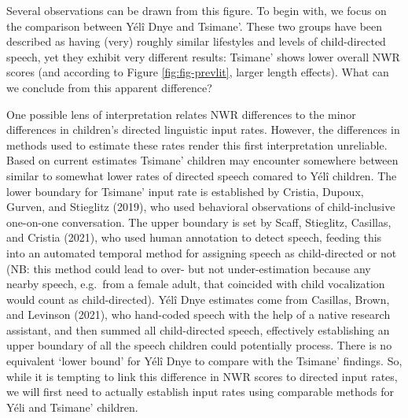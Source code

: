 \documentclass[
  american,
  ,doc,floatsintext]{apa6}
\begin{document}
Several observations can be drawn from this figure. To begin with, we focus on the comparison between Yélî Dnye and Tsimane'. These two groups have been described as having (very) roughly similar lifestyles and levels of child-directed speech, yet they exhibit very different results: Tsimane' shows lower overall NWR scores (and according to Figure \ref{fig:fig-prevlit}, larger length effects). What can we conclude from this apparent difference?

One possible lens of interpretation relates NWR differences to the minor differences in children's directed linguistic input rates. However, the differences in methods used to estimate these rates render this first interpretation unreliable. Based on current estimates Tsimane' children may encounter somewhere between similar to somewhat lower rates of directed speech comared to Yélî children. The lower boundary for Tsimane' input rate is established by Cristia, Dupoux, Gurven, and Stieglitz (2019), who used behavioral observations of child-inclusive one-on-one conversation. The upper boundary is set by Scaff, Stieglitz, Casillas, and Cristia (2021), who used human annotation to detect speech, feeding this into an automated temporal method for assigning speech as child-directed or not (NB: this method could lead to over- but not under-estimation because any nearby speech, e.g.~from a female adult, that coincided with child vocalization would count as child-directed). Yélî Dnye estimates come from Casillas, Brown, and Levinson (2021), who hand-coded speech with the help of a native research assistant, and then summed all child-directed speech, effectively establishing an upper boundary of all the speech children could potentially process. There is no equivalent `lower bound' for Yélî Dnye to compare with the Tsimane' findings. So, while it is tempting to link this difference in NWR scores to directed input rates, we will first need to actually establish input rates using comparable methods for Yéli and Tsimane' children.
\end{document}
